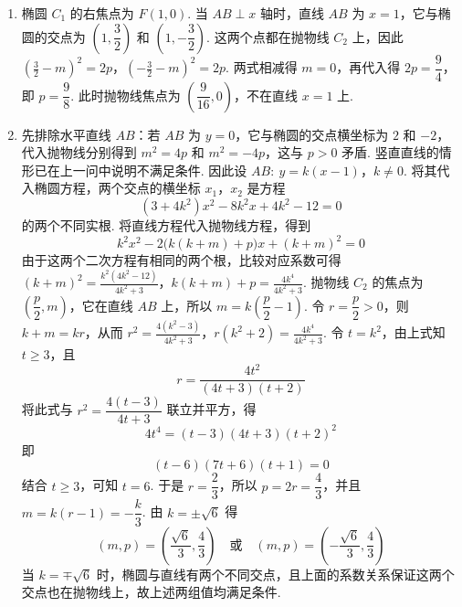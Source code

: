 \begin{solution}
\begin{enumerate}
\item 椭圆 \(C_1\) 的右焦点为 \(F(1,0)\). 当 \(AB\perp x\) 轴时，直线 \(AB\) 为 \(x=1\)，它与椭圆的交点为 \(\left(1,\dfrac{3}{2}\right)\) 和 \(\left(1,-\dfrac{3}{2}\right)\). 这两个点都在抛物线 \(C_2\) 上，因此
\(\left(\frac{3}{2}-m\right)^2=2p\)，\(\left(-\frac{3}{2}-m\right)^2=2p\).
两式相减得 \(m=0\)，再代入得 \(2p=\dfrac{9}{4}\)，即 \(p=\dfrac{9}{8}\). 此时抛物线焦点为 \(\left(\dfrac{9}{16},0\right)\)，不在直线 \(x=1\) 上.

\item 先排除水平直线 \(AB\)：若 \(AB\) 为 \(y=0\)，它与椭圆的交点横坐标为 \(2\) 和 \(-2\)，代入抛物线分别得到 \(m^2=4p\) 和 \(m^2=-4p\)，这与 \(p>0\) 矛盾. 竖直直线的情形已在上一问中说明不满足条件. 因此设
\(AB:\ y=k(x-1)\)，\(k\neq0\).
将其代入椭圆方程，两个交点的横坐标 \(x_1\)，\(x_2\) 是方程
\[
(3+4k^2)x^2-8k^2x+4k^2-12=0
\]
的两个不同实根. 将直线方程代入抛物线方程，得到
\[
k^2x^2-2\bigl(k(k+m)+p\bigr)x+(k+m)^2=0
\]
由于这两个二次方程有相同的两个根，比较对应系数可得
\((k+m)^2=\frac{k^2(4k^2-12)}{4k^2+3}\)，\(k(k+m)+p=\frac{4k^4}{4k^2+3}\).
抛物线 \(C_2\) 的焦点为 \(\left(\dfrac p2,m\right)\)，它在直线 \(AB\) 上，所以 \(m=k\left(\dfrac p2-1\right)\). 令 \(r=\dfrac p2>0\)，则 \(k+m=kr\)，从而
\(r^2=\frac{4(k^2-3)}{4k^2+3}\)，\(r(k^2+2)=\frac{4k^4}{4k^2+3}\).
令 \(t=k^2\)，由上式知 \(t\geqslant3\)，且
\[
r=\frac{4t^2}{(4t+3)(t+2)}
\]
将此式与 \(r^2=\dfrac{4(t-3)}{4t+3}\) 联立并平方，得
\[
4t^4=(t-3)(4t+3)(t+2)^2
\]
即
\[
(t-6)(7t+6)(t+1)=0
\]
结合 \(t\geqslant3\)，可知 \(t=6\). 于是 \(r=\dfrac{2}{3}\)，所以 \(p=2r=\dfrac{4}{3}\)，并且 \(m=k(r-1)=-\dfrac{k}{3}\). 由 \(k=\pm\sqrt{6}\) 得
\[
(m,p)=\left(\frac{\sqrt{6}}{3},\frac{4}{3}\right)\quad\text{或}\quad (m,p)=\left(-\frac{\sqrt{6}}{3},\frac{4}{3}\right)
\]
当 \(k=\mp\sqrt{6}\) 时，椭圆与直线有两个不同交点，且上面的系数关系保证这两个交点也在抛物线上，故上述两组值均满足条件.
\end{enumerate}
\end{solution}
